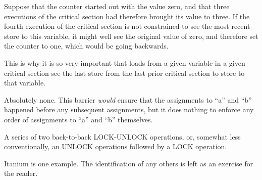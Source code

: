 
	Suppose that the counter started out with the value zero,
	and that three executions of the critical section had therefore
	brought its value to three.
	If the fourth execution of the critical section is not constrained
	to see the most recent store to this variable, it might well see
	the original value of zero, and therefore set the counter to
	one, which would be going backwards.
	
	This is why it is so very important that loads from a given variable
	in a given critical
	section see the last store from the last prior critical section to
	store to that variable.


	Absolutely none.  This barrier {\em would} ensure that the
	assignments to ``a'' and ``b'' happened before any subsequent
	assignments, but it does nothing to enforce any order of
	assignments to ``a'' and ``b'' themselves.


	A series of two back-to-back LOCK-UNLOCK operations, or, somewhat
	less conventionally, an UNLOCK operations followed by a LOCK
	operation.


	Itanium is one example.
	The identification of any others is left as an
	exercise for the reader.


